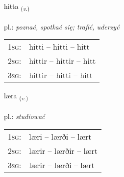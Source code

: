 \documentclass[frontgrid, backgrid]{flacards}\usepackage[]{graphicx}\usepackage[]{xcolor}
\begin{document}
\renewcommand{\blhead}{\vskip5pt {\small\bfseries\footnotesize Sagnorð | czasownik }}
\renewcommand{\bcfoot}{\vskip5pt \hspace{2pt}{\small\bfseries\footnotesize 1K}}


{hitta \small{\textsubscript{(\textit{v.})}} \\[1ex] %
\textphonetic{[hɪhta]} \\
pl.: \emph{poznać, spotkać się; trafić, uderzyć} \\  [2ex]
\renewcommand*{\arraystretch}{0.8}
\begin{tabular}{p{1cm}l}
\textsc{1sg}: & hitti -- hitti -- hitt \\ 
\textsc{2sg}: & hittir -- hittir -- hitt \\ 
\textsc{3sg}: & hittir -- hitti -- hitt \\ 
\end{tabular}
}

\renewcommand{\flhead}{\vskip5pt \fboxsep=0pt {\small\bfseries\footnotesize Sagnorð | czasownik}}
\renewcommand{\fcfoot}{\vskip5pt \fboxsep=0pt \hspace{2pt}{\small\bfseries\footnotesize 1K}}

\renewcommand{\blhead}{\vskip5pt {\small\bfseries\footnotesize Sagnorð | czasownik }}
\renewcommand{\bcfoot}{\vskip5pt \hspace{2pt}{\small\bfseries\footnotesize 1K}}


{læra \small{\textsubscript{(\textit{v.})}} \\[1ex] %
\textphonetic{[laiːra]} \\
pl.: \emph{studiować} \\  [2ex]
\renewcommand*{\arraystretch}{0.8}
\begin{tabular}{p{1cm}l}
\textsc{1sg}: & læri -- lærði -- lært \\ 
\textsc{2sg}: & lærir -- lærðir -- lært \\ 
\textsc{3sg}: & lærir -- lærði -- lært \\ 
\end{tabular}
}
\end{document}
